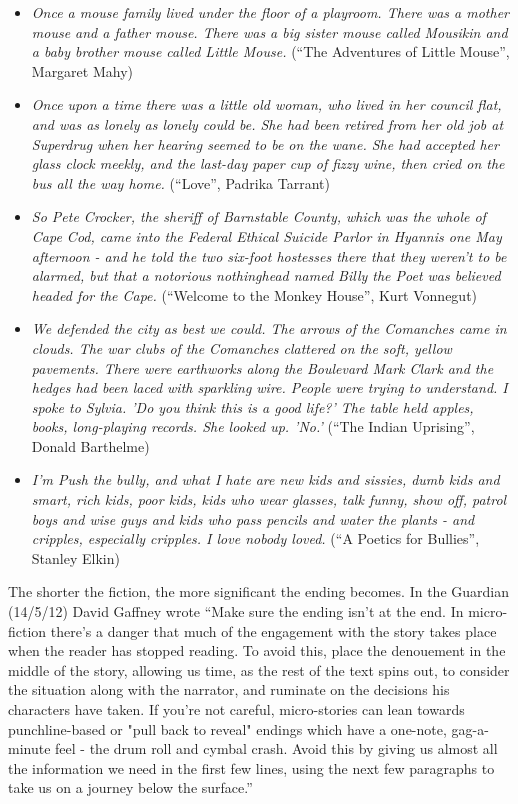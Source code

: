 \documentclass[11pt]{article}
\begin{document}
\begin{itemize}
\item \textit{Once a mouse family lived under the floor of a playroom. There was a mother mouse and a father mouse. There was a big sister mouse called Mousikin and a baby brother mouse called Little Mouse.} (``The Adventures of Little Mouse'', Margaret Mahy)
    \item \textit{Once upon a time there was a little old woman, who lived in her council flat, and was as lonely as lonely could be. She had been retired from her old job at Superdrug when her hearing seemed to be on the wane. She had accepted her glass clock meekly, and the last-day paper cup of fizzy wine, then cried on the bus all the way home.} (``Love'', Padrika Tarrant)
    \item \textit{So Pete Crocker, the sheriff of Barnstable County, which was the whole of Cape Cod, came into the Federal Ethical Suicide Parlor in Hyannis one May afternoon - and he told the two six-foot hostesses there that they weren't to be alarmed, but that a notorious nothinghead named Billy the Poet was believed headed for the Cape.} (``Welcome to the Monkey House'', Kurt Vonnegut)
    \item  \textit{We defended the city as best we could. The arrows of the Comanches came in clouds. The war clubs of the Comanches clattered on the soft, yellow pavements. There were earthworks along the Boulevard Mark Clark and the hedges had been laced with sparkling wire. People were trying to understand. I spoke to Sylvia. 'Do you think this is a good life?' The table held apples, books, long-playing records. She looked up. 'No.'} (``The Indian Uprising'', Donald Barthelme)
    \item \textit{I'm Push the bully, and what I hate are new kids and sissies, dumb kids and smart, rich kids, poor kids, kids who wear glasses, talk funny, show off, patrol boys and wise guys and kids who pass pencils and water the plants - and cripples, especially cripples. I love nobody loved.} (``A Poetics for Bullies'',  Stanley Elkin)
\end{itemize}

The shorter the fiction, the more significant the ending becomes. In the Guardian (14/5/12) David Gaffney wrote ``Make sure the ending isn't at the end.
In micro-fiction there's a danger that much of the engagement with the story takes place when the reader has stopped reading. To avoid this, place the denouement in the middle of the story, allowing us time, as the rest of the text spins out, to consider the situation along with the narrator, and ruminate on the decisions his characters have taken. If you're not careful, micro-stories can lean towards punchline-based or "pull back to reveal" endings which have a one-note, gag-a-minute feel - the drum roll and cymbal crash. Avoid this by giving us almost all the information we need in the first few lines, using the next few paragraphs to take us on a journey below the surface.''
\end{document}

